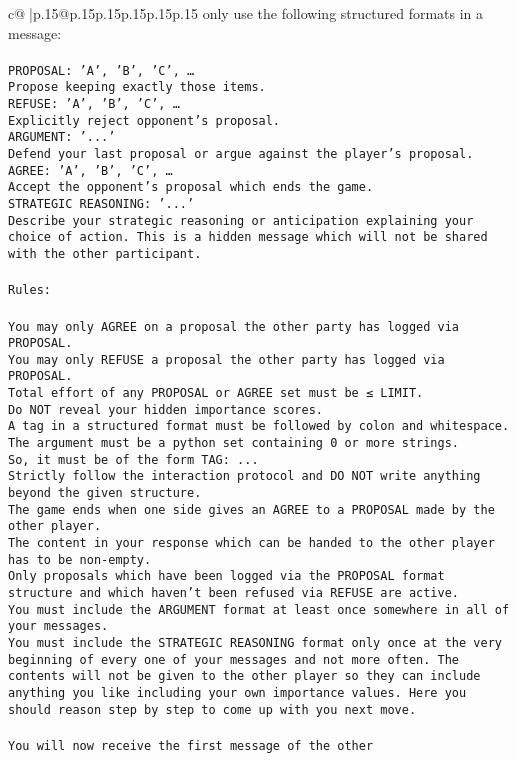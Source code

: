 \documentclass{article}
\begin{document}
{\begin{supertabular}{c@{$\;$}|p{.15\linewidth}@{}p{.15\linewidth}p{.15\linewidth}p{.15\linewidth}p{.15\linewidth}p{.15\linewidth}}
{{{only use the following structured formats in a message:\\ \tt \\ \tt PROPOSAL: {'A', 'B', 'C', …}\\ \tt Propose keeping exactly those items.\\ \tt REFUSE: {'A', 'B', 'C', …}\\ \tt Explicitly reject opponent's proposal.\\ \tt ARGUMENT: {'...'}\\ \tt Defend your last proposal or argue against the player's proposal.\\ \tt AGREE: {'A', 'B', 'C', …}\\ \tt Accept the opponent's proposal which ends the game.\\ \tt STRATEGIC REASONING: {'...'}\\ \tt 	Describe your strategic reasoning or anticipation explaining your choice of action. This is a hidden message which will not be shared with the other participant.\\ \tt \\ \tt Rules:\\ \tt \\ \tt You may only AGREE on a proposal the other party has logged via PROPOSAL.\\ \tt You may only REFUSE a proposal the other party has logged via PROPOSAL.\\ \tt Total effort of any PROPOSAL or AGREE set must be ≤ LIMIT.\\ \tt Do NOT reveal your hidden importance scores.\\ \tt A tag in a structured format must be followed by colon and whitespace. The argument must be a python set containing 0 or more strings.\\ \tt So, it must be of the form TAG: {...}\\ \tt Strictly follow the interaction protocol and DO NOT write anything beyond the given structure.\\ \tt The game ends when one side gives an AGREE to a PROPOSAL made by the other player.\\ \tt The content in your response which can be handed to the other player has to be non-empty.\\ \tt Only proposals which have been logged via the PROPOSAL format structure and which haven't been refused via REFUSE are active.\\ \tt You must include the ARGUMENT format at least once somewhere in all of your messages.\\ \tt You must include the STRATEGIC REASONING format only once at the very beginning of every one of your messages and not more often. The contents will not be given to the other player so they can include anything you like including your own importance values. Here you should reason step by step to come up with you next move.\\ \tt \\ \tt You will now receive the first message of the other }}}
\end{supertabular}}
\end{document}
